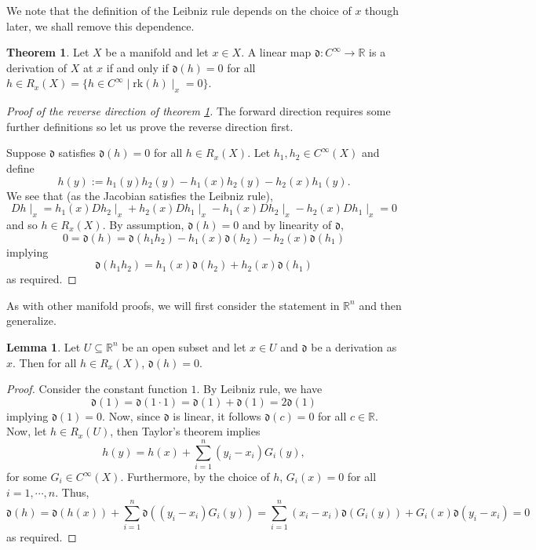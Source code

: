 \documentclass[]{article}
\theoremstyle{definition}
\newtheorem{theorem}{Theorem}
\theoremstyle{definition}
\newtheorem{lemma}{Lemma}[section]
\begin{document}
We note that the definition of the Leibniz rule depends on the choice of \(x\) 
though later, we shall remove this dependence.

\begin{theorem}\label{thm_der}
  Let \(X\) be a manifold and let \(x \in X\). A linear map \(\mathfrak{d} : 
  C^\infty \to \mathbb{R}\) is a derivation of \(X\) at \(x\) if and only if 
  \(\mathfrak{d}(h) = 0\) for all \(h \in R_x(X) = 
  \{h \in C^\infty \mid \text{rk}(h)\mid_x = 0\}\).
\end{theorem}
\begin{proof}[Proof of the reverse direction of theorem \ref{thm_der}]
  The forward direction requires some further definitions so let us prove the 
  reverse direction first. 

  Suppose \(\mathfrak{d}\) satisfies \(\mathfrak{d}(h) = 0\) for all 
  \(h \in R_x(X)\). Let \(h_1, h_2 \in C^\infty(X)\) and define 
  \[h(y) := h_1(y)h_2(y) - h_1(x)h_2(y) - h_2(x)h_1(y).\]
  We see that (as the Jacobian satisfies the Leibniz rule), 
  \[Dh\mid_x = h_1(x)Dh_2\mid_x + h_2(x) Dh_1\mid_x - 
  h_1(x)Dh_2\mid_x - h_2(x) Dh_1\mid_x = 0\]
  and so \(h \in R_x(X)\). By assumption, \(\mathfrak{d}(h) = 0\) and by 
  linearity of \(\mathfrak{d}\), 
  \[0 = \mathfrak{d}(h) = \mathfrak{d}(h_1h_2) - h_1(x)\mathfrak{d}(h_2) - 
    h_2(x)\mathfrak{d}(h_1)\]
  implying 
  \[\mathfrak{d}(h_1 h_2) = h_1(x)\mathfrak{d}(h_2) + h_2(x)\mathfrak{d}(h_1)\]
  as required.
\end{proof}

As with other manifold proofs, we will first consider the statement in 
\(\mathbb{R}^n\) and then generalize.

\begin{lemma}\label{der_r}
  Let \(U \subseteq \mathbb{R}^n\) be an open subset and let \(x \in U\) and 
  \(\mathfrak{d}\) be a derivation as \(x\). Then for all \(h \in R_x(X)\), 
  \(\mathfrak{d}(h) = 0\).
\end{lemma}
\begin{proof}
  Consider the constant function \(1\). By Leibniz rule, we have 
  \[\mathfrak{d}(1) = \mathfrak{d}(1 \cdot 1) = \mathfrak{d}(1) + \mathfrak{d}(1) = 
    2\mathfrak{d}(1)\]
  implying \(\mathfrak{d}(1) = 0\). Now, since \(\mathfrak{d}\) is linear, 
  it follows \(\mathfrak{d}(c) = 0\) for all \(c \in \mathbb{R}\). Now, let 
  \(h \in R_x(U)\), then Taylor's theorem implies 
  \[h(y) = h(x) + \sum_{i = 1}^n(y_i - x_i)G_i(y),\]
  for some \(G_i \in C^\infty(X)\). Furthermore, by the choice of \(h\), 
  \(G_i(x) = 0\) for all \(i = 1, \cdots, n\). Thus, 
  \[\mathfrak{d}(h) = \mathfrak{d}(h(x)) + 
    \sum_{i = 1}^n \mathfrak{d}((y_i - x_i)G_i(y))
    = \sum_{i = 1}^n (x_i - x_i) \mathfrak{d}(G_i(y)) + G_i(x) 
      \mathfrak{d}(y_i - x_i) = 0\]
  as required.
\end{proof}
\end{document}
